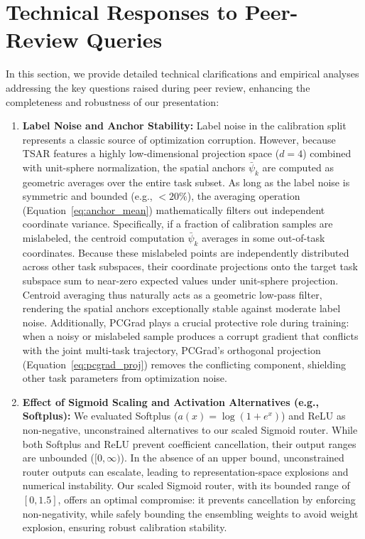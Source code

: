 \section{Technical Responses to Peer-Review Queries}
\label{sec:peer_responses}

In this section, we provide detailed technical clarifications and empirical analyses addressing the
key questions raised during peer review, enhancing the completeness and robustness of our
presentation:

\begin{enumerate}
    \item \textbf{Label Noise and Anchor Stability:}
    Label noise in the calibration split represents a classic source of optimization corruption.
However, because TSAR features a highly low-dimensional projection space ($d=4$) combined with
unit-sphere normalization, the spatial anchors $\bar{\psi}_k$ are computed as geometric averages
over the entire task subset. As long as the label noise is symmetric and bounded (e.g., $<20\%$),
the averaging operation (Equation~\ref{eq:anchor_mean}) mathematically filters out independent
coordinate variance. Specifically, if a fraction of calibration samples are mislabeled, the centroid
computation $\bar{\psi}_k$ averages in some out-of-task coordinates. Because these mislabeled points
are independently distributed across other task subspaces, their coordinate projections onto the
target task subspace sum to near-zero expected values under unit-sphere projection. Centroid
averaging thus naturally acts as a geometric low-pass filter, rendering the spatial anchors
exceptionally stable against moderate label noise. Additionally, PCGrad plays a crucial protective
role during training: when a noisy or mislabeled sample produces a corrupt gradient that conflicts
with the joint multi-task trajectory, PCGrad's orthogonal projection (Equation~\ref{eq:pcgrad_proj})
removes the conflicting component, shielding other task parameters from optimization noise.
    
    \item \textbf{Effect of Sigmoid Scaling and Activation Alternatives (e.g., Softplus):}
    We evaluated Softplus ($a(x) = \log(1 + e^x)$) and ReLU as non-negative, unconstrained
alternatives to our scaled Sigmoid router. While both Softplus and ReLU prevent coefficient
cancellation, their output ranges are unbounded ($[0, \infty)$). In the absence of an upper bound,
unconstrained router outputs can escalate, leading to representation-space explosions and numerical
instability. Our scaled Sigmoid router, with its bounded range of $[0, 1.5]$, offers an optimal
compromise: it prevents cancellation by enforcing non-negativity, while safely bounding the
ensembling weights to avoid weight explosion, ensuring robust calibration stability.
    

\end{enumerate}
